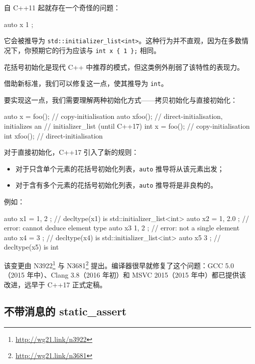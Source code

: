 自 C++11 起就存在一个奇怪的问题：

\begin{codebox}[cpp]
auto x { 1 };
\end{codebox}

它会被推导为 \texttt{std::initializer\_list<int>}。这种行为并不直观，因为在多数情况下，你预期它的行为应该与 \texttt{int x \{ 1 \};} 相同。

花括号初始化是现代 C++ 中推荐的模式，但这类例外削弱了该特性的表现力。

借助新标准，我们可以修复这一点，使其推导为 \texttt{int}。

要实现这一点，我们需要理解两种初始化方式——拷贝初始化与直接初始化：

\begin{codebox}[cpp]
auto x = foo();
// copy-initialisation
auto x{foo()};
// direct-initialisation, initializes an
// initializer_list (until C++17)
int x = foo();
// copy-initialisation
int x{foo()};
// direct-initialisation
\end{codebox}

对于直接初始化，C++17 引入了新的规则：
\begin{itemize}
\item 对于只含单个元素的花括号初始化列表，\texttt{auto} 推导将从该元素出发；
\item 对于含有多个元素的花括号初始化列表，\texttt{auto} 推导将是非良构的。
\end{itemize}

例如：

\begin{codebox}[cpp]
auto x1 = { 1, 2 };
// decltype(x1) is std::initializer_list<int>
auto x2 = { 1, 2.0 }; // error: cannot deduce element type
auto x3{ 1, 2 };
// error: not a single element
auto x4 = { 3 };
// decltype(x4) is std::initializer_list<int>
auto x5{ 3 };
// decltype(x5) is int
\end{codebox}

\begin{myInfoBox}
该变更由 N3922\footnote{\url{http://wg21.link/n3922}} 与 N3681\footnote{\url{http://wg21.link/n3681}} 提出。编译器很早就修复了这个问题：GCC 5.0（2015 年中）、Clang 3.8（2016 年初）和 MSVC 2015（2015 年中）都已提供该改进，远早于 C++17 正式定稿。
\end{myInfoBox}

\subsection{不带消息的 static\_assert}

